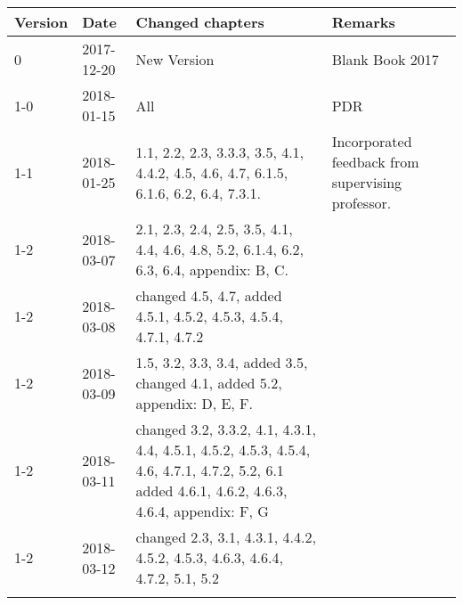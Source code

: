 \begin{longtable}{|p{}| p{} |p{} |p{}|}\hline
    \centering
    \textbf{Version}    & \textbf{Date}     & \textbf{Changed chapters} & \textbf{Remarks} \\\hline
    0       &   2017-12-20   & New Version   & Blank Book 2017  \\
    1-0     &   2018-01-15   & All           & PDR \\ 
    1-1     &   2018-01-25   & 1.1, 2.2, 2.3, 3.3.3, 3.5, 4.1, 4.4.2, 4.5, 4.6, 4.7, 6.1.5, 6.1.6, 6.2, 6.4, 7.3.1. & Incorporated feedback from supervising professor.\\ 
    1-2     &   2018-03-07   & 2.1, 2.3, 2.4, 2.5, 3.5, 4.1, 4.4, 4.6, 4.8, 5.2, 6.1.4, 6.2, 6.3, 6.4, appendix: B, C.     &    \\\hline 
    1-2     &   2018-03-08   & changed 4.5, 4.7, added 4.5.1, 4.5.2, 4.5.3, 4.5.4, 4.7.1, 4.7.2     &    \\\hline
    1-2     &   2018-03-09   & 1.5, 3.2, 3.3, 3.4, added 3.5, changed 4.1, added 5.2,  appendix: D, E, F.     & \\\hline 
    1-2     &   2018-03-11   & changed 3.2, 3.3.2, 4.1, 4.3.1, 4.4, 4.5.1, 4.5.2, 4.5.3, 4.5.4, 4.6, 4.7.1, 4.7.2, 5.2, 6.1 added 4.6.1, 4.6.2, 4.6.3, 4.6.4, appendix: F, G &    \\\hline 
    1-2     &   2018-03-12   & changed 2.3, 3.1, 4.3.1, 4.4.2, 4.5.2, 4.5.3, 4.6.3, 4.6.4, 4.7.2, 5.1, 5.2 \\\hline 
   
    \label{COR}
\end{longtable}